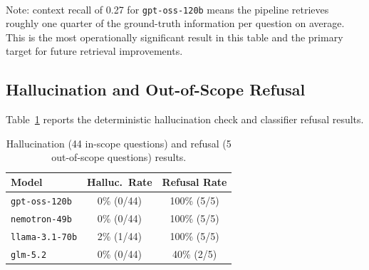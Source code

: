\documentclass[conference]{IEEEtran}
\begin{document}

\begin{table}[htbp]
  \centering
  \caption{RAGAS benchmark (44 in-scope questions).
    Run~A: judge saw answer only, not context --- invalid for
    faithfulness.
    Run~B: judge saw answer and context --- valid.
    Cells marked ${}^*$ are Run~A values pending a valid re-score.
  }
  \label{tab:ragas}
  \\[4pt]
  \small
  Note: context recall of 0.27 for \texttt{gpt-oss-120b} means the
  pipeline retrieves roughly one quarter of the ground-truth
  information per question on average.
  This is the most operationally significant result in this table
  and the primary target for future retrieval improvements.
\end{table}

\subsection{Hallucination and Out-of-Scope Refusal}

Table~\ref{tab:hallucination} reports the deterministic hallucination
check and classifier refusal results.

\begin{table}[htbp]
  \centering
  \caption{Hallucination (44 in-scope questions) and refusal
    (5 out-of-scope questions) results.}
  \label{tab:hallucination}
  \begin{tabular}{@{}lcc@{}}
    \toprule
    Model & Halluc.\ Rate & Refusal Rate \\
    \midrule
    \texttt{gpt-oss-120b}  & 0\% (0/44)  & 100\% (5/5) \\
    \texttt{nemotron-49b}  & 0\% (0/44)  & 100\% (5/5) \\
    \texttt{llama-3.1-70b} & 2\% (1/44)  & 100\% (5/5) \\
    \texttt{glm-5.2}       & 0\% (0/44)  &  40\% (2/5) \\
    \bottomrule
  \end{tabular}
\end{table}
\end{document}
